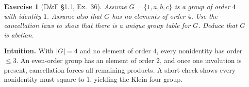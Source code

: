 \documentclass[12pt]{article}
\newtheorem{exercise}[theorem]{Exercise}
\theoremstyle{definition}
\begin{document}
\begin{exercise}[D\&F §1.1, Ex.~36]
Assume $G=\{1,a,b,c\}$ is a group of order $4$ with identity $1$. Assume also that $G$ has no
elements of order $4$. Use the cancellation laws to show that there is a unique group table for $G$.
Deduce that $G$ is abelian.
\end{exercise}

\dotfill

\noindent
\textbf{Intuition.}
With $|G|=4$ and no element of order $4$, every nonidentity has order $\le3$. An even-order group has an
element of order $2$, and once one involution is present, cancellation forces all remaining products.
A short check shows every nonidentity must square to $1$, yielding the Klein four group.

\dotfill
\end{document}
